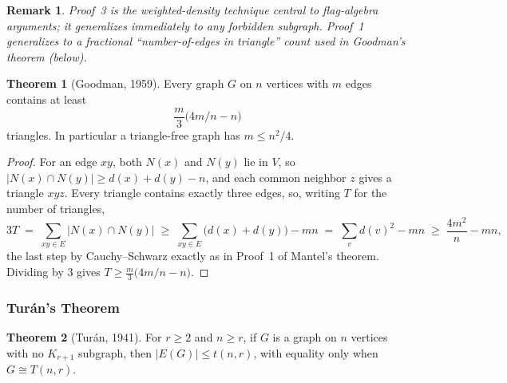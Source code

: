 \documentclass{article}
\newtheorem{remark}{Remark}
\theoremstyle{definition}
\newtheorem{theorem}{Theorem}
\begin{document}
\begin{remark}
Proof~3 is the weighted-density technique central to flag-algebra
arguments; it generalizes immediately to any forbidden subgraph.
Proof~1 generalizes to a fractional ``number-of-edges in triangle''
count used in Goodman's theorem (below).
\end{remark}

\begin{theorem}[Goodman, 1959]
Every graph $G$ on $n$ vertices with $m$ edges contains at least
\[
  \frac{m}{3}\big( 4m/n - n \big)
\]
triangles. In particular a triangle-free graph has $m \le n^2/4$.
\end{theorem}

\begin{proof}
For an edge $xy$, both $N(x)$ and $N(y)$ lie in $V$, so
$|N(x) \cap N(y)| \ge d(x) + d(y) - n$, and each common neighbor $z$
gives a triangle $xyz$. Every triangle contains exactly three edges, so,
writing $T$ for the number of triangles,
\[
  3T \;=\; \sum_{xy \in E} |N(x) \cap N(y)|
     \;\ge\; \sum_{xy \in E} \big(d(x) + d(y)\big) - mn
     \;=\; \sum_{v} d(v)^2 - mn
     \;\ge\; \frac{4m^2}{n} - mn,
\]
the last step by Cauchy--Schwarz exactly as in Proof~1 of Mantel's theorem.
Dividing by $3$ gives $T \ge \frac{m}{3}\big(4m/n - n\big)$.
\end{proof}

\subsubsection{Tur\'an's Theorem}

\begin{theorem}[Tur\'an, 1941]\label{thm:turan}
For $r \ge 2$ and $n \ge r$, if $G$ is a graph on $n$ vertices with
no $K_{r+1}$ subgraph, then $|E(G)| \le t(n, r)$, with equality
only when $G \cong T(n, r)$.
\end{theorem}
\end{document}
